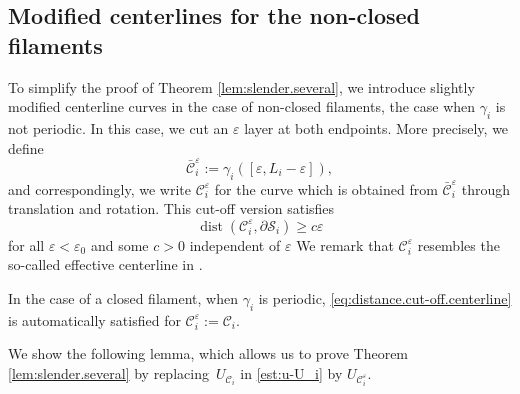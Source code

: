 \documentclass[JEP,XML,SOM,Unicode, NoEqCountersInSection,NoFloatCountersInSection,published]{cedram}
\let\eps\varepsilon
\DeclareMathOperator{\dist}{dist}
\theoremstyle{definition}
\theoremstyle{remark}
\begin{document}
\subsection{Modified centerlines for the non-closed filaments}
\label{sec:non-closed}

To simplify the proof of Theorem \ref{lem:slender.several},
we introduce slightly modified centerline curves in the case of non-closed filaments, \ie the case when $\gamma_i$ is not periodic. In this case, we cut an $\eps$ layer at both endpoints. More precisely, we define
\begin{equation}
\bar {\mathcal C}_i^\eps := \gamma_i([\eps,L_i - \eps]),
\end{equation}
and correspondingly, we write $\mathcal C_i^\eps$ for the curve which is obtained from $\bar {\mathcal C}_i^\eps$ through translation and rotation.
This cut-off version satisfies
\begin{equation} \label{eq:distance.cut-off.centerline}
\dist(\mathcal C_i^\eps,\partial \mathcal S_i) \geq c \eps
\end{equation}
for all $\eps < \eps_0$ and some $c > 0$ independent of $\eps$
We remark that $\mathcal C_i^\eps$ resembles the so-called effective centerline in \cite{Mori-Ohm-free-ends}.

In the case of a closed filament, \ie when $\gamma_i$ is periodic, \eqref{eq:distance.cut-off.centerline} is automatically satisfied for $\mathcal C_i^\eps := \mathcal C_i$.

We show the following lemma, which allows us to prove Theorem \ref{lem:slender.several} by replacing~$U_{\mathcal C_i}$ in \eqref{est:u-U_i} by
$U_{\mathcal C_i^\eps}$.
\end{document}
